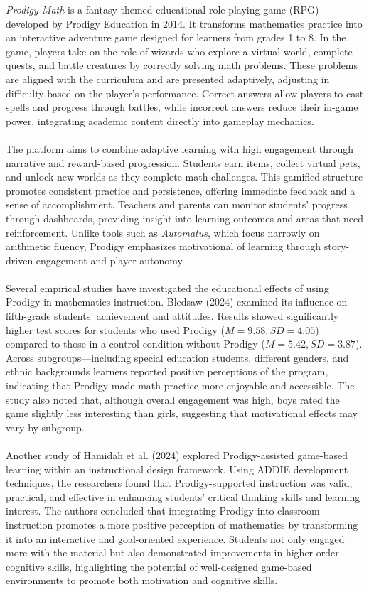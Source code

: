 \textit{Prodigy Math} is a fantasy-themed educational role-playing game (RPG) developed by Prodigy Education in 2014. It transforms mathematics practice into an interactive adventure game designed for learners from grades 1 to 8. In the game, players take on the role of wizards who explore a virtual world, complete quests, and battle creatures by correctly solving math problems. These problems are aligned with the curriculum and are presented adaptively, adjusting in difficulty based on the player's performance. Correct answers allow players to cast spells and progress through battles, while incorrect answers reduce their in-game power, integrating academic content directly into gameplay mechanics. \\ \\
The platform aims to combine adaptive learning with high engagement through narrative and reward-based progression. Students earn items, collect virtual pets, and unlock new worlds as they complete math challenges. This gamified structure promotes consistent practice and persistence, offering immediate feedback and a sense of accomplishment. Teachers and parents can monitor students' progress through dashboards, providing insight into learning outcomes and areas that need reinforcement. Unlike tools such as \textit{Automatus}, which focus narrowly on arithmetic fluency, Prodigy emphasizes motivational of learning through story-driven engagement and player autonomy. \\ \\
Several empirical studies have investigated the educational effects of using Prodigy in mathematics instruction. Bledsaw (2024) \cite{bledsaw_investigating_nodate} examined its influence on fifth-grade students' achievement and attitudes. Results showed significantly higher test scores for students who used Prodigy (\(M = 9.58, SD = 4.05\)) compared to those in a control condition without Prodigy (\(M = 5.42, SD = 3.87\)). Across subgroups—including special education students, different genders, and ethnic backgrounds learners reported positive perceptions of the program, indicating that Prodigy made math practice more enjoyable and accessible. The study also noted that, although overall engagement was high, boys rated the game slightly less interesting than girls, suggesting that motivational effects may vary by subgroup. \\ \\
Another study of Hamidah et al. (2024) \cite{hamidah2024prodigy} explored Prodigy-assisted game-based learning within an instructional design framework. Using ADDIE development techniques, the researchers found that Prodigy-supported instruction was valid, practical, and effective in enhancing students' critical thinking skills and learning interest. The authors concluded that integrating Prodigy into classroom instruction promotes a more positive perception of mathematics by transforming it into an interactive and goal-oriented experience. Students not only engaged more with the material but also demonstrated improvements in higher-order cognitive skills, highlighting the potential of well-designed game-based environments to promote both motivation and cognitive skills. \\ \\
